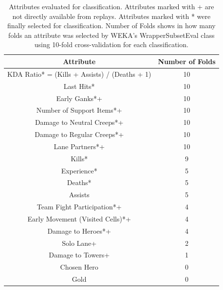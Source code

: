 \renewcommand{\arraystretch}{1.5}
\setlength{\tabcolsep}{12pt}
\begin{table}[]
\caption{Attributes evaluated for classification. Attributes marked with + are not directly available from replays. Attributes marked with {*} were finally selected for classification. Number of Folds shows in how many folds an attribute was selected by WEKA’s WrapperSubsetEval class using 10-fold cross-validation for each classification.}
\label{table:table1}
\centering
\begin{tabular}{|c|c|}
\hline
\textbf{Attribute}                            & \textbf{Number of Folds} \\ \hline
KDA Ratio* = (Kills + Assists) / (Deaths + 1) & 10                       \\ \hline
Last Hits*                                    & 10                       \\ \hline
Early Ganks*+                                 & 10                       \\ \hline
Number of Support Items*+                     & 10                       \\ \hline
Damage to Neutral Creeps*+                    & 10                       \\ \hline
Damage to Regular Creeps*+                    & 10                       \\ \hline
Lane Partners*+                               & 10                       \\ \hline
Kills*                                        & 9                        \\ \hline
Experience*                                   & 5                        \\ \hline
Deaths*                                       & 5                        \\ \hline
Assists                                       & 5                        \\ \hline
Team Fight Participation*+                    & 4                        \\ \hline
Early Movement (Visited Cells)*+              & 4                        \\ \hline
Damage to Heroes*+                            & 4                        \\ \hline
Solo Lane+                                    & 2                        \\ \hline
Damage to Towers+                             & 1                        \\ \hline
Chosen Hero                                   & 0                        \\ \hline
Gold                                          & 0                        \\ \hline
\end{tabular}
\end{table}